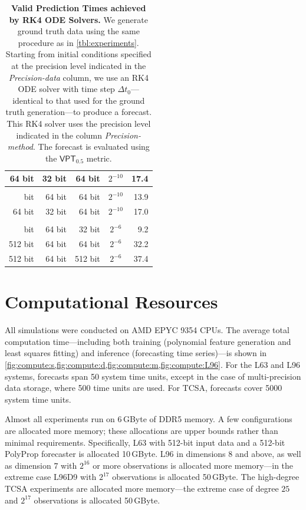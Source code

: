 \documentclass{article}
\newcommand{\stepsize}{\Delta\!t}
\newcommand{\vpt}[1]{\mathsf{VPT}_{#1}}
\begin{document}
\begin{table}
\begin{center}
\begin{center}
\begin{tabular}{rrrcr}
64 bit & 32 bit & 64 bit & $2^{-10}$ & 17.4 \\ 
\midrule\addlinespace[2.5pt]
\multicolumn{5}{l}{L96D9} \\[2.5pt] 
\midrule\addlinespace[2.5pt]
32 bit & 64 bit & 64 bit & $2^{-10}$ & 13.9 \\ 
64 bit & 32 bit & 64 bit & $2^{-10}$ & 17.0 \\ 
\midrule\addlinespace[2.5pt]
\multicolumn{5}{l}{TCSA} \\[2.5pt] 
\midrule\addlinespace[2.5pt]
512 bit & 64 bit & 32 bit & $2^{-6}$ & 9.2 \\ 
512 bit & 64 bit & 64 bit & $2^{-6}$ & 32.2 \\ 
512 bit & 64 bit & 512 bit & $2^{-6}$ & 37.4 \\ 
\bottomrule
\end{tabular}
\end{center}


	\end{center}
	\caption{\textbf{Valid Prediction Times achieved by RK4 ODE Solvers.} We generate ground truth data using the same procedure as in \cref{tbl:experiments}. Starting from initial conditions specified at the precision level indicated in the \textit{Precision-data} column, we use an RK4 ODE solver with time step $\stepsize_0$---identical to that used for the ground truth generation---to produce a forecast. This RK4 solver uses the precision level indicated in the column \textit{Precision-method}. The forecast is evaluated using the $\vpt{0.5}$ metric.}\label{tbl:vpt:solver}
\end{table}
\clearpage
\section{Computational Resources}\label{app:sec:compute}
%
All simulations were conducted on AMD EPYC 9354 CPUs. The average total computation time---including both training (polynomial feature generation and least squares fitting) and inference (forecasting time series)---is shown in \cref{fig:compute:s,fig:compute:d,fig:compute:m,fig:compute:L96}. For the L63 and L96 systems, forecasts span 50 system time units, except in the case of multi-precision data storage, where 500 time units are used. For TCSA, forecasts cover 5000 system time units.

Almost all experiments run on 6\,GByte of DDR5 memory. A few configurations are allocated more memory; these allocations are upper bounds rather than minimal requirements. Specifically, L63 with 512-bit input data and a 512-bit PolyProp forecaster is allocated 10\,GByte. L96 in dimensions $8$ and above, as well as dimension $7$ with $2^{16}$ or more observations is allocated more memory---in the extreme case L96D9 with $2^{17}$ observations is allocated 50\,GByte. The high-degree TCSA experiments are allocated more memory---the extreme case of degree $25$ and $2^{17}$ observations is allocated 50\,GByte.
\end{document}
